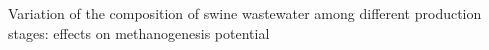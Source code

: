 Variation of the composition of swine wastewater among different production stages: effects on methanogenesis potential